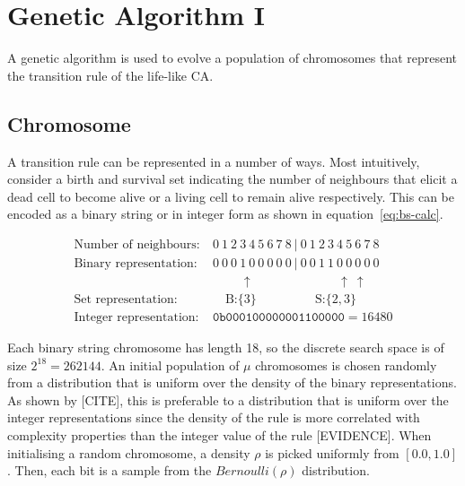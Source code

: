 \section{Genetic Algorithm I}\label{sec:ga-1}

A genetic algorithm is used to evolve a population of chromosomes that represent the transition rule of the life-like CA.

\subsection{Chromosome}
A transition rule can be represented in a number of ways. Most intuitively, consider a birth and survival set indicating the number of neighbours that elicit a dead cell to become alive or a living cell to remain alive respectively. This can be encoded as a binary string or in integer form as shown in equation~\ref{eq:bs-calc}.

\begin{equation} \label{eq:bs-calc}
\begin{split}
    \text{Number of neighbours:}&\ 0\ 1\ 2\ 3\ 4\ 5\ 6\ 7\ 8\ |\ 0\ 1\ 2\ 3\ 4\ 5\ 6\ 7\ 8\\
    \text{Binary representation:}&\ 0\ 0\ 0\ 1\ 0\ 0\ 0\ 0\ 0\ |\ 0\ 0\ 1\ 1\ 0\ 0\ 0\ 0\ 0\\
    &\qquad\ \: \uparrow \qquad \qquad \qquad \ \: \: \uparrow \ \uparrow\\
    \text{Set representation:}&\quad \ \text{B:} \{3\} \qquad \qquad \ \ \: \text{S:}\{2, 3\}\\
    \text{Integer representation:}&\ \texttt{0b000100000001100000} = 16480
\end{split}   
\end{equation}

Each binary string chromosome has length 18, so the discrete search space is of size $2^{18} = 262144$. An initial population of $\mu$ chromosomes is chosen randomly from a distribution that is uniform over the density of the binary representations. As shown by [CITE], this is preferable to a distribution that is uniform over the integer representations since the density of the rule is more correlated with complexity properties than the integer value of the rule [EVIDENCE]. When initialising a random chromosome, a density $\rho$ is picked uniformly from $[0.0, 1.0]$. Then, each bit is a sample from the $\mathit{Bernoulli}(\rho)$ distribution.\\

